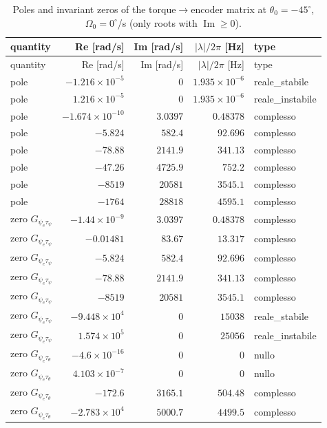 \documentclass[10pt,a4paper]{article}
\numberwithin{equation}{section}
\begin{document}
\begin{longtable}{lrrrl}
\caption{Poles and invariant zeros of the torque$\to$encoder matrix at $\theta_0 = -45^\circ$, $\Omega_0 = 0^\circ$/s (only roots with $\operatorname{Im} \ge 0$).}\label{tab:polezero}\\
\toprule quantity & Re [rad/s] & Im [rad/s] & $|\lambda|/2\pi$ [Hz] & type \\ \midrule\endfirsthead
\toprule quantity & Re [rad/s] & Im [rad/s] & $|\lambda|/2\pi$ [Hz] & type \\ \midrule\endhead
pole & $-1.216\times10^{-5}$ & $0$ & $1.935\times10^{-6}$ & reale\_stabile \\
pole & $1.216\times10^{-5}$ & $0$ & $1.935\times10^{-6}$ & reale\_instabile \\
pole & $-1.674\times10^{-10}$ & $3.0397$ & $0.48378$ & complesso \\
pole & $-5.824$ & $582.4$ & $92.696$ & complesso \\
pole & $-78.88$ & $2141.9$ & $341.13$ & complesso \\
pole & $-47.26$ & $4725.9$ & $752.2$ & complesso \\
pole & $-8519$ & $20581$ & $3545.1$ & complesso \\
pole & $-1764$ & $28818$ & $4595.1$ & complesso \\
\midrule
zero $G_{\psi_e\tau_\psi}$ & $-1.44\times10^{-9}$ & $3.0397$ & $0.48378$ & complesso \\
zero $G_{\psi_e\tau_\psi}$ & $-0.01481$ & $83.67$ & $13.317$ & complesso \\
zero $G_{\psi_e\tau_\psi}$ & $-5.824$ & $582.4$ & $92.696$ & complesso \\
zero $G_{\psi_e\tau_\psi}$ & $-78.88$ & $2141.9$ & $341.13$ & complesso \\
zero $G_{\psi_e\tau_\psi}$ & $-8519$ & $20581$ & $3545.1$ & complesso \\
zero $G_{\psi_e\tau_\psi}$ & $-9.448\times10^{4}$ & $0$ & $15038$ & reale\_stabile \\
zero $G_{\psi_e\tau_\psi}$ & $1.574\times10^{5}$ & $0$ & $25056$ & reale\_instabile \\
\midrule
zero $G_{\psi_e\tau_\theta}$ & $-4.6\times10^{-16}$ & $0$ & $0$ & nullo \\
zero $G_{\psi_e\tau_\theta}$ & $4.103\times10^{-7}$ & $0$ & $0$ & nullo \\
zero $G_{\psi_e\tau_\theta}$ & $-172.6$ & $3165.1$ & $504.48$ & complesso \\
zero $G_{\psi_e\tau_\theta}$ & $-2.783\times10^{4}$ & $5000.7$ & $4499.5$ & complesso \\

\end{longtable}
\end{document}
